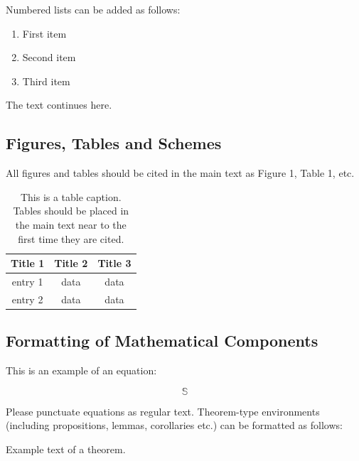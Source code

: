 \documentclass[bioengineering,article,submit,moreauthors,pdftex,10pt,a4paper]{mdpi}
\begin{document}
Numbered lists can be added as follows:
\begin{enumerate}[leftmargin=*,labelsep=4.9mm]
\item	First item 
\item	Second item
\item	Third item
\end{enumerate}

The text continues here.

\subsection{Figures, Tables and Schemes}

All figures and tables should be cited in the main text as Figure 1, Table 1, etc.


\begin{table}[H]
\caption{This is a table caption. Tables should be placed in the main text near to the first time they are cited.}
\centering
\begin{tabular}{ccc}
\toprule
\textbf{Title 1}	& \textbf{Title 2}	& \textbf{Title 3}\\
\midrule
entry 1		& data			& data\\
entry 2		& data			& data\\
\bottomrule
\end{tabular}
\end{table}

\subsection{Formatting of Mathematical Components}

This is an example of an equation:

\begin{equation}
\mathbb{S}
\end{equation}

Please punctuate equations as regular text. Theorem-type environments (including propositions, lemmas, corollaries etc.) can be formatted as follows:
\begin{Theorem}
Example text of a theorem.
\end{Theorem}
\end{document}
